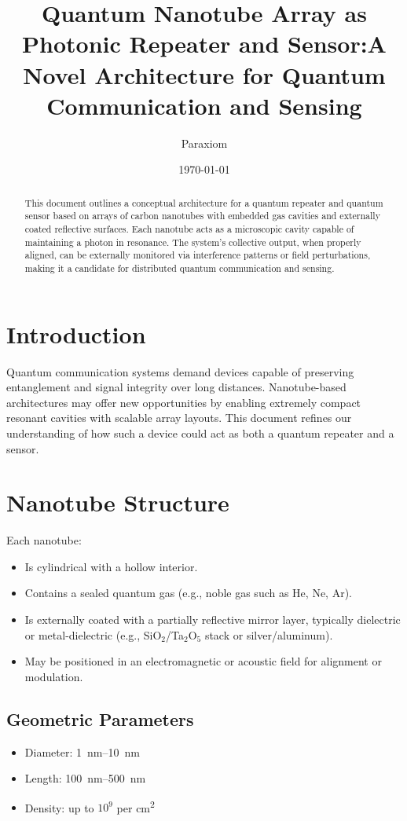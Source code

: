 \documentclass[11pt]{article}
\title{Quantum Nanotube Array as Photonic Repeater and Sensor:\newline A Novel Architecture for Quantum Communication and Sensing}
\author{Paraxiom}
\date{\today}
\begin{document}
	
	\maketitle
	
	\begin{abstract}
		This document outlines a conceptual architecture for a quantum repeater and quantum sensor based on arrays of carbon nanotubes with embedded gas cavities and externally coated reflective surfaces. Each nanotube acts as a microscopic cavity capable of maintaining a photon in resonance. The system's collective output, when properly aligned, can be externally monitored via interference patterns or field perturbations, making it a candidate for distributed quantum communication and sensing.
	\end{abstract}
	
	\section{Introduction}
	Quantum communication systems demand devices capable of preserving entanglement and signal integrity over long distances. Nanotube-based architectures may offer new opportunities by enabling extremely compact resonant cavities with scalable array layouts. This document refines our understanding of how such a device could act as both a quantum repeater and a sensor.
	
	\section{Nanotube Structure}
	Each nanotube:
	\begin{itemize}
		\item Is cylindrical with a hollow interior.
		\item Contains a sealed quantum gas (e.g., noble gas such as He, Ne, Ar).
		\item Is externally coated with a partially reflective mirror layer, typically dielectric or metal-dielectric (e.g., SiO$_2$/Ta$_2$O$_5$ stack or silver/aluminum).
		\item May be positioned in an electromagnetic or acoustic field for alignment or modulation.
	\end{itemize}
	
	\subsection{Geometric Parameters}
	\begin{itemize}
		\item Diameter: \SIrange{1}{10}{\nano\meter}
		\item Length: \SIrange{100}{500}{\nano\meter}
		\item Density: up to $10^9$ per \si{cm^2}
	\end{itemize}
	
\end{document}
